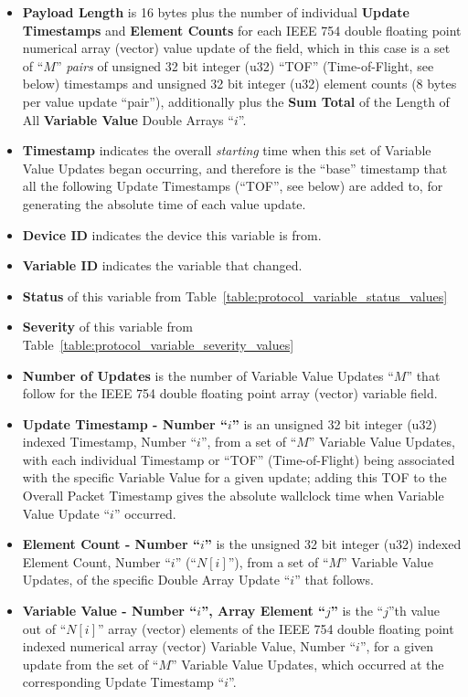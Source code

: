 \begin{itemize}
\item{\bf Payload Length} is 16 bytes plus the number
of individual {\bf Update Timestamps} and {\bf Element Counts}
for each IEEE 754 double floating point numerical array (vector)
value update of the field,
which in this case is a set of ``$M$'' {\it pairs} of
unsigned 32 bit integer (u32) ``TOF'' (Time-of-Flight, see below)
timestamps
and unsigned 32 bit integer (u32) element counts
(8 bytes per value update ``pair''),
additionally plus the {\bf Sum Total} of the Length of All
{\bf Variable Value} Double Arrays ``$i$''.
\item{\bf Timestamp} indicates the overall {\it starting} time when
this set of Variable Value Updates began occurring,
and therefore is the ``base'' timestamp that
all the following Update Timestamps (``TOF'', see below)
are added to, for generating the absolute time of each value update.
\item{\bf Device ID} indicates the device this variable is from.
\item{\bf Variable ID} indicates the variable that changed.
\item{\bf Status} of this variable from
Table~\ref{table:protocol_variable_status_values}
\item{\bf Severity} of this variable from
Table~\ref{table:protocol_variable_severity_values}
\item{\bf Number of Updates}
is the number of Variable Value Updates ``$M$'' that follow
for the IEEE 754 double floating point array (vector) variable field.
\item{\bf Update Timestamp - Number ``$i$''} is an
unsigned 32 bit integer (u32) indexed Timestamp, Number ``$i$'',
from a set of ``$M$'' Variable Value Updates,
with each individual Timestamp or ``TOF'' (Time-of-Flight)
being associated with the specific Variable Value for a given update;
adding this TOF to the Overall Packet Timestamp gives the
absolute wallclock time when Variable Value Update ``$i$'' occurred.
\item{\bf Element Count - Number ``$i$''} is the
unsigned 32 bit integer (u32) indexed Element Count, Number ``$i$''
(``$N[i]$''),
from a set of ``$M$'' Variable Value Updates,
of the specific Double Array Update ``$i$'' that follows.
\item{\bf Variable Value - Number ``$i$'', Array Element ``$j$''} is
the ``$j$''th value out of ``$N[i]$'' array (vector) elements
of the IEEE 754 double floating point indexed numerical array (vector)
Variable Value, Number ``$i$'',
for a given update from the set of ``$M$'' Variable Value Updates,
which occurred at the corresponding Update Timestamp ``$i$''.
\end{itemize}

